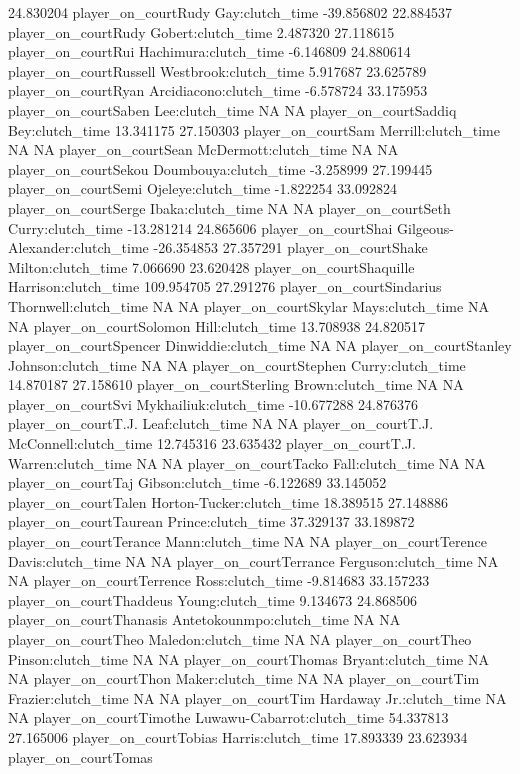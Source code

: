 \documentclass[
  landscape]{article}
\begin{document}
24.830204 player\_on\_courtRudy Gay:clutch\_time -39.856802 22.884537
player\_on\_courtRudy Gobert:clutch\_time 2.487320 27.118615
player\_on\_courtRui Hachimura:clutch\_time -6.146809 24.880614
player\_on\_courtRussell Westbrook:clutch\_time 5.917687 23.625789
player\_on\_courtRyan Arcidiacono:clutch\_time -6.578724 33.175953
player\_on\_courtSaben Lee:clutch\_time NA NA player\_on\_courtSaddiq
Bey:clutch\_time 13.341175 27.150303 player\_on\_courtSam
Merrill:clutch\_time NA NA player\_on\_courtSean McDermott:clutch\_time
NA NA player\_on\_courtSekou Doumbouya:clutch\_time -3.258999 27.199445
player\_on\_courtSemi Ojeleye:clutch\_time -1.822254 33.092824
player\_on\_courtSerge Ibaka:clutch\_time NA NA player\_on\_courtSeth
Curry:clutch\_time -13.281214 24.865606 player\_on\_courtShai
Gilgeous-Alexander:clutch\_time -26.354853 27.357291
player\_on\_courtShake Milton:clutch\_time 7.066690 23.620428
player\_on\_courtShaquille Harrison:clutch\_time 109.954705 27.291276
player\_on\_courtSindarius Thornwell:clutch\_time NA NA
player\_on\_courtSkylar Mays:clutch\_time NA NA player\_on\_courtSolomon
Hill:clutch\_time 13.708938 24.820517 player\_on\_courtSpencer
Dinwiddie:clutch\_time NA NA player\_on\_courtStanley
Johnson:clutch\_time NA NA player\_on\_courtStephen Curry:clutch\_time
14.870187 27.158610 player\_on\_courtSterling Brown:clutch\_time NA NA
player\_on\_courtSvi Mykhailiuk:clutch\_time -10.677288 24.876376
player\_on\_courtT.J. Leaf:clutch\_time NA NA player\_on\_courtT.J.
McConnell:clutch\_time 12.745316 23.635432 player\_on\_courtT.J.
Warren:clutch\_time NA NA player\_on\_courtTacko Fall:clutch\_time NA NA
player\_on\_courtTaj Gibson:clutch\_time -6.122689 33.145052
player\_on\_courtTalen Horton-Tucker:clutch\_time 18.389515 27.148886
player\_on\_courtTaurean Prince:clutch\_time 37.329137 33.189872
player\_on\_courtTerance Mann:clutch\_time NA NA
player\_on\_courtTerence Davis:clutch\_time NA NA
player\_on\_courtTerrance Ferguson:clutch\_time NA NA
player\_on\_courtTerrence Ross:clutch\_time -9.814683 33.157233
player\_on\_courtThaddeus Young:clutch\_time 9.134673 24.868506
player\_on\_courtThanasis Antetokounmpo:clutch\_time NA NA
player\_on\_courtTheo Maledon:clutch\_time NA NA player\_on\_courtTheo
Pinson:clutch\_time NA NA player\_on\_courtThomas Bryant:clutch\_time NA
NA player\_on\_courtThon Maker:clutch\_time NA NA player\_on\_courtTim
Frazier:clutch\_time NA NA player\_on\_courtTim Hardaway
Jr.:clutch\_time NA NA player\_on\_courtTimothe
Luwawu-Cabarrot:clutch\_time 54.337813 27.165006 player\_on\_courtTobias
Harris:clutch\_time 17.893339 23.623934 player\_on\_courtTomas
\end{document}
